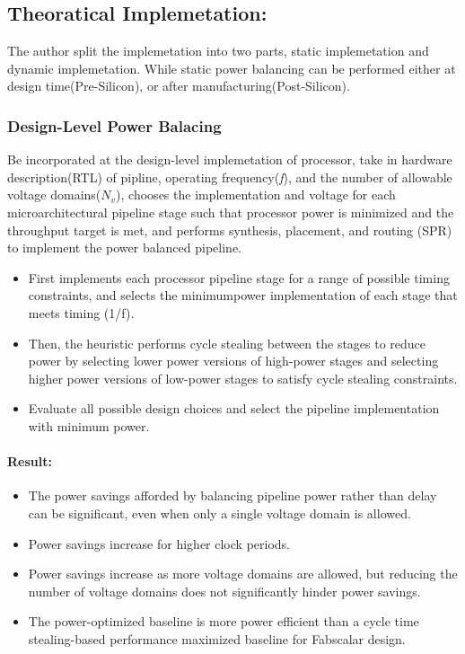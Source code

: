 \documentclass{article}
\begin{document}
\subsection{Theoratical Implemetation:}
The author split the implemetation into two parts, static implemetation and dynamic implemetation. While static power balancing can be performed either at design time(Pre-Silicon), or after manufacturing(Post-Silicon).

\subsubsection{Design-Level Power Balacing}
Be incorporated at the design-level implemetation of processor, take in hardware description(RTL) of pipline, operating frequency(\emph{f}), and the number of allowable voltage domains($N_{v}$), chooses the implementation and voltage for each microarchitectural pipeline stage such that processor power is minimized and the throughput target is met, and performs synthesis, placement, and routing (SPR) to implement the power balanced pipeline. \\
\begin{itemize}
	\item First implements each processor pipeline stage for a range of possible timing constraints, and selects the minimumpower implementation of each stage that meets timing
    (1/f). 
	\item Then, the heuristic performs cycle stealing between the stages to reduce power by selecting lower power versions of high-power stages and selecting higher power versions of low-power stages to satisfy cycle stealing constraints.
	\item Evaluate all possible design choices and select the pipeline implementation
    with minimum power. 
\end{itemize}
\paragraph{Result:} 
\begin{itemize}
    \item The power savings afforded by balancing pipeline power rather than delay can be significant, even when only a single voltage domain is allowed.
    \item Power savings increase for higher clock periods.
    \item Power savings increase as more voltage domains are allowed, but reducing the number of voltage
    domains does not significantly hinder power savings.
    \item  The power-optimized baseline is more power efficient than a cycle time stealing-based performance maximized baseline for Fabscalar design.
\end{itemize}
\end{document}

